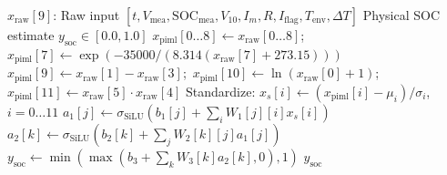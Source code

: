 \begin{algorithm}[!t]
	\caption{Deterministic MISRA-C Routine in \texttt{bms\_soc\_piml\_mlp3.h}}
	\label{alg:c_code}
	\begin{algorithmic}[1]
		\scriptsize
		\REQUIRE $x_{\text{raw}}[9]$: Raw input $[t, V_{\text{mea}}, \text{SOC}_{\text{mea}}, V_{10}, I_m, R, I_{\text{flag}}, T_{\text{env}}, \Delta T]$
		\ENSURE Physical SOC estimate $y_{\text{soc}} \in [0.0, 1.0]$
		\STATE $x_{\text{piml}}[0\dots8] \leftarrow x_{\text{raw}}[0\dots8]$;\ $x_{\text{piml}}[7] \leftarrow \exp(-35000/(8.314(x_{\text{raw}}[7]+273.15)))$
		\STATE $x_{\text{piml}}[9] \leftarrow x_{\text{raw}}[1]-x_{\text{raw}}[3]$;\ $x_{\text{piml}}[10] \leftarrow \ln(x_{\text{raw}}[0]+1)$;\ $x_{\text{piml}}[11] \leftarrow x_{\text{raw}}[5]\cdot x_{\text{raw}}[4]$
		\STATE Standardize: $x_s[i] \leftarrow (x_{\text{piml}}[i]-\mu_i)/\sigma_i$,\ $i=0\dots11$
		\STATE $a_1[j] \leftarrow \sigma_{\text{SiLU}}(b_1[j] + \sum_i W_1[j][i] x_s[i])$
		\ENDFOR
		\STATE $a_2[k] \leftarrow \sigma_{\text{SiLU}}(b_2[k] + \sum_j W_2[k][j] a_1[j])$
		\ENDFOR
		\STATE $y_{\text{soc}} \leftarrow \min(\max(b_3 + \sum_k W_3[k] a_2[k], 0), 1)$ 
		\RETURN $y_{\text{soc}}$
	\end{algorithmic}
\end{algorithm}